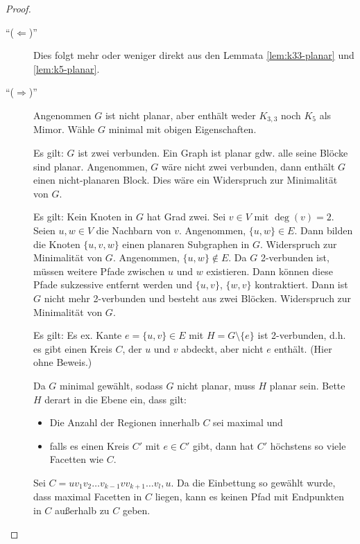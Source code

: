 \begin{proof}~\par
    \begin{description}
        \item[``($ \Leftarrow $)''] Dies folgt mehr oder weniger direkt aus den Lemmata \ref{lem:k33-planar} und \ref{lem:k5-planar}.
        \item[``($ \Rightarrow $)''] Angenommen $ G $ ist nicht planar, aber enthält weder $ K_{3,3} $ noch $ K_5 $ als Mimor.
        Wähle $ G $ minimal mit obigen Eigenschaften.

        Es gilt: $ G $ ist zwei verbunden.
        Ein Graph ist planar gdw. alle seine Blöcke sind planar.
        Angenommen, $ G $ wäre nicht zwei verbunden, dann enthält $ G $ einen nicht-planaren Block.
        Dies wäre ein Widerspruch zur Minimalität von $ G $.

        Es gilt: Kein Knoten in $ G $ hat Grad zwei.
        Sei $ v \in V $ mit $ \deg(v) = 2 $.
        Seien $ u, w \in V $ die Nachbarn von $ v $.
        Angenommen, $ \{ u, w \} \in E $. Dann bilden die Knoten $ \{ u, v, w \} $ einen planaren Subgraphen in $ G $.
        Widerspruch zur Minimalität von $ G $.
        Angenommen, $ \{ u, w \} \notin E $.
        Da $ G $ 2-verbunden ist, müssen weitere Pfade zwischen $ u $ und $ w $ existieren.
        Dann können diese Pfade sukzessive entfernt werden und $ \{ u, v\} $, $ \{ w, v \} $ kontraktiert.
        Dann ist $ G $ nicht mehr 2-verbunden und besteht aus zwei Blöcken.
        Widerspruch zur Minimalität von $ G $.

        Es gilt: Es ex. Kante $ e = \{ u, v \} \in E $ mit $ H = G \setminus \{ e \} $ ist 2-verbunden, d.h. es gibt einen Kreis $ C $, der $ u $ und $ v $ abdeckt, aber nicht $ e $ enthält. (Hier ohne Beweis.)

        Da $ G $ minimal gewählt, sodass $ G $ nicht planar, muss $ H $ planar sein.
        Bette $ H $ derart in die Ebene ein, dass gilt:
        \begin{itemize}
            \item Die Anzahl der Regionen innerhalb $ C $ sei maximal und
            \item falls es einen Kreis $ C' $ mit $ e \in C' $ gibt, dann hat $ C' $ höchstens so viele Facetten wie $ C $.
        \end{itemize}

        Sei $ C = u v_1 v_2 \dots v_{k-1} v v_{k + 1} \dots v_l, u $.
        Da die Einbettung so gewählt wurde, dass maximal Facetten in $ C $ liegen, kann es keinen Pfad mit Endpunkten in $ C $ außerhalb zu $ C $ geben.


\end{description}
\end{proof}
